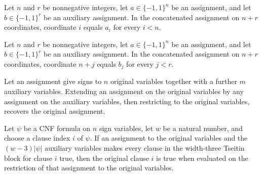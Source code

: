 \begin{theorem}
\label{FABL.extendCNFAssignment_castAdd}
\leanok
{}
Let $n$ and $r$ be nonnegative integers, let $a\in\{-1,1\}^n$ be an assignment, and let
$b\in\{-1,1\}^r$ be an auxiliary assignment. In the concatenated assignment on $n+r$
coordinates, coordinate $i$ equals $a_i$ for every $i<n$.
\end{theorem}

\begin{theorem}
\label{FABL.extendCNFAssignment_natAdd}
\leanok
{}
Let $n$ and $r$ be nonnegative integers, let $a\in\{-1,1\}^n$ be an assignment, and let
$b\in\{-1,1\}^r$ be an auxiliary assignment. In the concatenated assignment on $n+r$
coordinates, coordinate $n+j$ equals $b_j$ for every $j<r$.
\end{theorem}

\begin{theorem}
\label{FABL.restrict_extendCNFAssignment}
\leanok
{}
Let an assignment give signs to $n$ original variables together with a further $m$
auxiliary variables. Extending an assignment on the original variables by any assignment
on the auxiliary variables, then restricting to the original variables, recovers the
original assignment.
\end{theorem}

\begin{theorem}
\label{FABL.clauseAt_true_of_widthThreeTseitinClauseBlock_true}
\leanok
{}
Let $\psi$ be a CNF formula on $n$ sign variables, let $w$ be a natural
number, and choose a clause index $i$ of $\psi$. If an assignment to the
original variables and the $(w-3)|\psi|$ auxiliary variables makes every
clause in the width-three Tseitin block for clause $i$ true, then the original clause
$i$ is true when evaluated on the restriction of that assignment to the original
variables.
\end{theorem}

